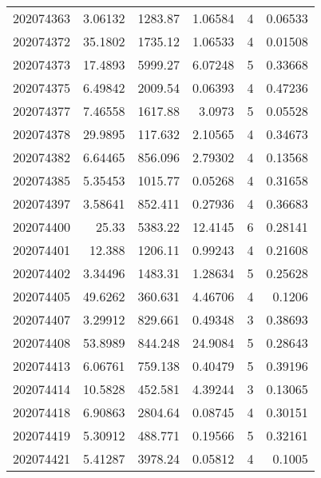 \begin{tabular}{rrrrrr}
 202074363 &          3.06132 &     1283.87   &            1.06584 &           4 & 0.06533 \\
 202074372 &         35.1802  &     1735.12   &            1.06533 &           4 & 0.01508 \\
 202074373 &         17.4893  &     5999.27   &            6.07248 &           5 & 0.33668 \\
 202074375 &          6.49842 &     2009.54   &            0.06393 &           4 & 0.47236 \\
 202074377 &          7.46558 &     1617.88   &            3.0973  &           5 & 0.05528 \\
 202074378 &         29.9895  &      117.632  &            2.10565 &           4 & 0.34673 \\
 202074382 &          6.64465 &      856.096  &            2.79302 &           4 & 0.13568 \\
 202074385 &          5.35453 &     1015.77   &            0.05268 &           4 & 0.31658 \\
 202074397 &          3.58641 &      852.411  &            0.27936 &           4 & 0.36683 \\
 202074400 &         25.33    &     5383.22   &           12.4145  &           6 & 0.28141 \\
 202074401 &         12.388   &     1206.11   &            0.99243 &           4 & 0.21608 \\
 202074402 &          3.34496 &     1483.31   &            1.28634 &           5 & 0.25628 \\
 202074405 &         49.6262  &      360.631  &            4.46706 &           4 & 0.1206  \\
 202074407 &          3.29912 &      829.661  &            0.49348 &           3 & 0.38693 \\
 202074408 &         53.8989  &      844.248  &           24.9084  &           5 & 0.28643 \\
 202074413 &          6.06761 &      759.138  &            0.40479 &           5 & 0.39196 \\
 202074414 &         10.5828  &      452.581  &            4.39244 &           3 & 0.13065 \\
 202074418 &          6.90863 &     2804.64   &            0.08745 &           4 & 0.30151 \\
 202074419 &          5.30912 &      488.771  &            0.19566 &           5 & 0.32161 \\
 202074421 &          5.41287 &     3978.24   &            0.05812 &           4 & 0.1005  \\

\end{tabular}
